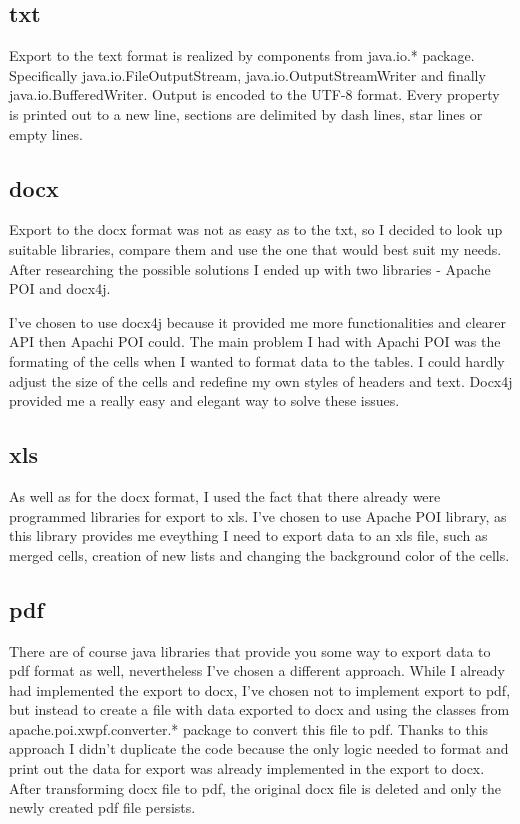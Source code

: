 \documentclass[thesis=B,english]{FITthesis}[2012/10/20]
\begin{document}
\subsection{txt}
Export to the text format is realized by components from java.io.* package. Specifically java.io.FileOutputStream, java.io.OutputStreamWriter and finally java.io.BufferedWriter. Output is encoded to the UTF-8 format. Every property is printed out to a new line, sections are delimited by dash lines, star lines or empty lines.
\subsection{docx}
Export to the docx format was not as easy as to the txt, so I decided to look up suitable libraries, compare them and use the one that would best suit my needs. After researching the possible solutions I ended up with two libraries - Apache POI and docx4j.

I've chosen to use docx4j because it provided me more functionalities and clearer API then Apachi POI could. The main problem I had with Apachi POI was the formating of the cells when I wanted to format data to the tables. I could hardly adjust the size of the cells and redefine my own styles of headers and text. Docx4j provided me a really easy and elegant way to solve these issues.
\subsection{xls}
As well as for the docx format, I used the fact that there already were programmed libraries for export to xls.
I've chosen to use Apache POI library, as this library provides me eveything I need to export data to an xls file, such as merged cells, creation of new lists and changing the background color of the cells.
\subsection{pdf}
There are of course java libraries that provide you some way to export data to pdf format as well, nevertheless I've chosen a different approach. While I already had implemented the export to docx, I've chosen not to implement export to pdf, but instead to create a file with data exported to docx and using the classes from apache.poi.xwpf.converter.* package to convert this file to pdf. Thanks to this approach I didn't duplicate the code because the only logic needed to format and print out the data for export was already implemented in the export to docx. After transforming docx file to pdf, the original docx file is deleted and only the newly created pdf file persists.
\end{document}
